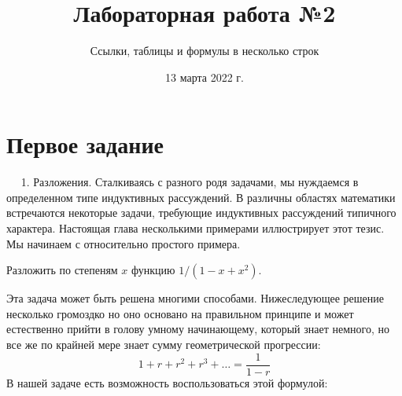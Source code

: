 \documentclass[a4paper,12pt]{article} %
\author{Ссылки, таблицы и формулы в несколько строк}
\title{Лабораторная работа №2}
\date{13 марта 2022 г.}
\begin{document}
	
	\maketitle %
	
	\section{Первое задание}	
	
	$\quad$
	1. Разложения. Сталкиваясь с разного родя задачами, мы нуждаемся в определенном типе индуктивных рассуждений. В различны областях математики встречаются некоторые задачи, требующие индуктивных рассуждений типичного характера. Настоящая глава несколькими примерами иллюстрирует этот тезис. Мы начинаем с относительно простого примера.
	
	Разложить по степеням $x$ функцию $1 / \left(1 - x + x^2 \right).$
	
	Эта задача может быть решена многими способами. Нижеследующее решение несколько громоздко но оно основано на правильном принципе и может естественно прийти в голову умному начинающему, который знает немного, но все же по крайней мере знает сумму геометрической прогрессии:
	$$1 + r + r^2 + r^3 + \dots = \frac{1}{1 - r}$$
	В нашей задаче есть возможность воспользоваться этой формулой:
	
\end{document}

